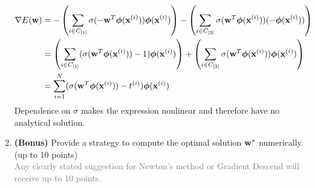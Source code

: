 \documentclass[12pt,a4paper]{article}
\newcommand{\gray}[1]{\textcolor{gray}{#1}}
\renewcommand{\v}[1]{\ifmmode\mathbf{#1}\fi}
\renewcommand{\l}{\left}
\renewcommand{\r}{\right}
\newcommand{\SUM}[2]{\sum\limits_{#1}^{#2}}
\newcommand{\solution}[1]{\gray{#1}}
\begin{document}
\begin{enumerate}[label=(\alph*)]
{\begin{align*}
\nabla E(\v w) & = -\l(\sum_{i\in C_{[1]}} \sigma(-\v w^T \boldsymbol\phi(\v x^{(i)}))\boldsymbol\phi(\v x^{(i)})\r) - \l(\sum_{i\in C_{[2]}} \sigma(\v w^T \boldsymbol\phi(\v x^{(i)}))(-\boldsymbol\phi(\v x^{(i)}))\r) \\
& = \l(\sum_{i\in C_{[1]}} (\sigma(\v w^T \boldsymbol\phi(\v x^{(i)}))-1)\boldsymbol\phi(\v x^{(i)})\r) + \l(\sum_{i\in C_{[2]}} \sigma(\v w^T \boldsymbol\phi(\v x^{(i)}))\boldsymbol\phi(\v x^{(i)})\r) \\
& = \SUM{i=1}N (\sigma(\v w^T \boldsymbol\phi(\v x^{(i)})) - t^{(i)}) \boldsymbol\phi(\v x^{(i)})
\end{align*}
Dependence on $\sigma$ makes the expression nonlinear and therefore have no analytical solution.
}
%
\item \textbf{(Bonus)} Provide a strategy to compute the optimal solution $\v w^\ast$ numerically. (up to 10 points) \\
\solution{Any clearly stated suggestion for Newton's method or Gradient Descend will receive up to 10 points.}
\end{enumerate}
\end{document}

